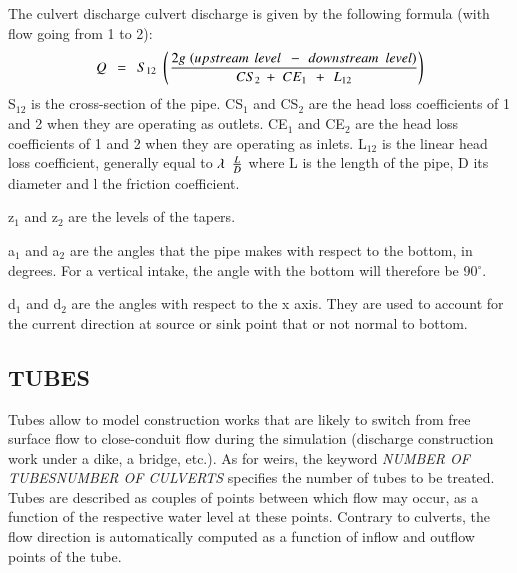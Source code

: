 \documentclass{article} %
\begin{document}
 The culvert discharge culvert discharge is given by the following formula (with flow going from 1 to 2):
\[Q{\kern 1pt} {\kern 1pt} {\kern 1pt} {\kern 1pt} {\kern 1pt} ={\kern 1pt} {\kern 1pt} {\kern 1pt} {\kern 1pt} {\kern 1pt} S_{12} {\kern 1pt} {\kern 1pt} {\kern 1pt} \left({\kern 1pt} \frac{2g{\kern 1pt} {\kern 1pt} {\kern 1pt} (upstream{\kern 1pt} {\kern 1pt} {\kern 1pt} {\kern 1pt} level{\kern 1pt} {\kern 1pt} {\kern 1pt} {\kern 1pt} {\kern 1pt} -{\kern 1pt} {\kern 1pt} {\kern 1pt} {\kern 1pt} downstream{\kern 1pt} {\kern 1pt} {\kern 1pt} {\kern 1pt} {\kern 1pt} level)}{CS_{2} {\kern 1pt} {\kern 1pt} +{\kern 1pt} {\kern 1pt} {\kern 1pt} CE_{1} {\kern 1pt} {\kern 1pt} {\kern 1pt} {\kern 1pt} +{\kern 1pt} {\kern 1pt} {\kern 1pt} {\kern 1pt} L_{12} } \right)\]
S${}_{12}$ is the cross-section of the pipe. CS${}_{1}$ and CS${}_{2}$ are the head loss coefficients of 1 and 2 when they are operating as outlets. CE${}_{1}$ and CE${}_{2}$ are the head loss coefficients of 1 and 2 when they are operating as inlets. L${}_{12}$ is the linear head loss coefficient, generally equal to $\lambda {\kern 1pt} {\kern 1pt} {\kern 1pt} {\kern 1pt} {\kern 1pt} \frac{L}{D} $ where L is the length of the pipe, D its diameter and l the friction coefficient.

 z${}_{1}$ and z${}_{2}$ are the levels of the tapers.

 a${}_{1}$ and a${}_{2}$ are the angles that the pipe makes with respect to the bottom, in degrees. For a vertical intake, the angle with the bottom will therefore be 90${}^\circ$.

 d${}_{1}$ and d${}_{2}$ are the angles with respect to the x axis. They are used to account for the current direction at source or sink point that or not normal to bottom.


\subsection{ TUBES}

 Tubes allow to model construction works that are likely to switch from free surface flow to close-conduit flow during the simulation (discharge construction work under a dike, a bridge, etc.). As for weirs, the keyword \textit{NUMBER OF TUBESNUMBER OF CULVERTS} specifies the number of tubes to be treated. Tubes are described as couples of points between which flow may occur, as a function of the respective water level at these points. Contrary to culverts, the flow direction is automatically computed as a function of inflow and outflow points of the tube.
\end{document}
